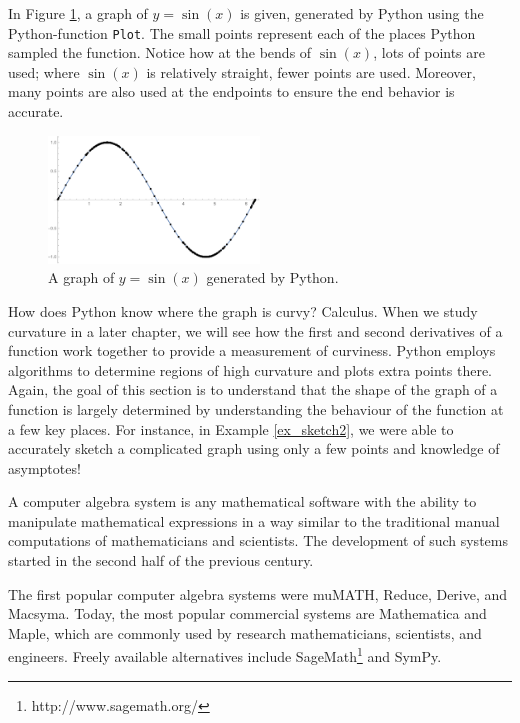 In Figure \ref{fig_behaviour_28}, a graph of $y=\sin(x)$ is given, generated by Python using the Python-function \lstinline{Plot}. The small points represent each of the places Python sampled the function. Notice how at the bends of $\sin (x)$, lots of points are used; where $\sin(x)$ is relatively straight, fewer points are used. Moreover, many points are also used at the endpoints to ensure the end behavior is accurate. 
\begin{figure}
	\begin{center}
			\includegraphics[width=0.5\textwidth]{fig_behaviour_28}
	\caption{A graph of $y=\sin(x)$ generated by Python.}
	\label{fig_behaviour_28}
	\end{center}
\end{figure}
How does Python know where the graph is curvy? Calculus. When we study curvature in a later chapter, we will see how the first and second derivatives of a function work together to provide a measurement of curviness. Python employs algorithms to determine regions of high curvature and plots extra points there.
\fi
Again, the goal of this section is to understand that the shape of the graph of a function is largely determined by understanding the behaviour of the function at a few key places. For instance, in Example \ref{ex_sketch2}, we were able to accurately sketch a complicated graph using only a few points and knowledge of asymptotes!

\begin{remark}
 A computer algebra system is any mathematical software with the ability to manipulate mathematical expressions in a way similar to the traditional manual computations of mathematicians and scientists. The development of such  systems started in the second half of the previous century. 
 
 The first popular computer algebra systems were muMATH, Reduce, Derive, and Macsyma. Today, the most popular commercial systems are Mathematica and Maple, which are commonly used by research mathematicians, scientists, and engineers. Freely available alternatives include SageMath\footnote{http://www.sagemath.org/} and SymPy. 
\end{remark}

